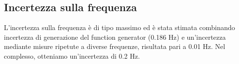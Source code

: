 \documentclass[../Relazione_circuiti.tex]{subfile}
\begin{document}
\subsection{Incertezza sulla frequenza}
L'incertezza sulla frequenza è di tipo massimo ed è stata stimata combinando incertezza di generazione del function generator (0.186 Hz) e un'incertezza mediante misure ripetute a diverse frequenze, risultata pari a 0.01 Hz. Nel complesso, otteniamo un'incertezza di 0.2 Hz.
\end{document}
